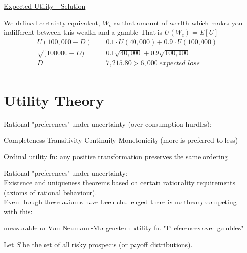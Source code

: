 \documentclass[
14pt,notheorems,hyperref={pdfauthor=whatever}
]{beamer}
\begin{document}
\begin{frame}
\underline{Expected Utility - Solution}
\hfill \break
\begin{outline}
    \1 We defined certainty equivalent, $W_c$  as that amount of wealth which makes you indifferent between this wealth and a gamble\break
    \1 That is $U(W_c) = E[U]$
    \begin{align*}
        U(100,000 - D) &= 0.1\cdot U(40,000) + 0.9\cdot U(100,000)\\
        \sqrt(100000-D) &= 0.1\sqrt{40,000} + 0.9\sqrt{100,000}\\
        D &= 7,215.80 > 6,000 \textit{ expected loss }\\
    \end{align*}
\end{outline}
\end{frame}


\section{Utility Theory}  %

\begin{frame}
Rational "preferences" under uncertainty (over consumption hurdles):\\
\begin{outline}
    \1 Completeness
    \1 Transitivity
    \1 Continuity
    \1 Monotonicity (more is preferred to less)
\end{outline}
Ordinal utility fn: any positive transformation preserves the same ordering\\
\end{frame}

\begin{frame}
Rational "preferences" under uncertainty:\\
\hfill \break
Existence and uniqueness theorems based on certain rationality requirements (axioms of rational behaviour).\\
\hfill \break
Even though these axioms have been challenged there is no theory competing with this:\\
\begin{outline}
    \1 measurable or Von Neumann-Morgenstern utility fn.
      \2 "Preferences over gambles"
\end{outline}
\hfill \break
Let $S$ be the set of all risky prospects (or payoff distributions).\\
\end{frame}
\end{document}
